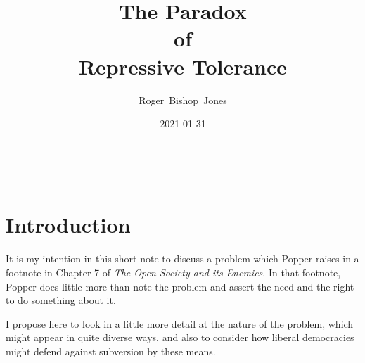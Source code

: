 \documentclass[10pt,titlepage]{article}
\title{\bf\LARGE The Paradox \\of \\Repressive Tolerance}
\author{Roger~Bishop~Jones}
\date{\small 2021-01-31}
\newcommand{\ignore}[1]{}
\begin{document}
%
%
% 
                               
\begin{titlepage}
\maketitle





\end{titlepage}

\ \

\ignore{
\begin{centering}
{}
\end{centering}
}%

\setcounter{tocdepth}{2}
{\parskip-0pt\tableofcontents}


\pagebreak

\ignore{
\section*{Preface}
\phantomsection

\addcontentsline{toc}{section}{Preface}
}%

\section{Introduction}

It is my intention in this short note to discuss a problem which Popper raises in a footnote in Chapter 7 of \emph{The Open Society and its Enemies}\cite{popper-ose}.
In that footnote, Popper does little more than note the problem and assert the need and the right to do something about it.

I propose here to look in a little more detail at the nature of the problem, which might appear in quite diverse ways, and also to consider how liberal democracies might defend against subversion by these means.
\end{document}
